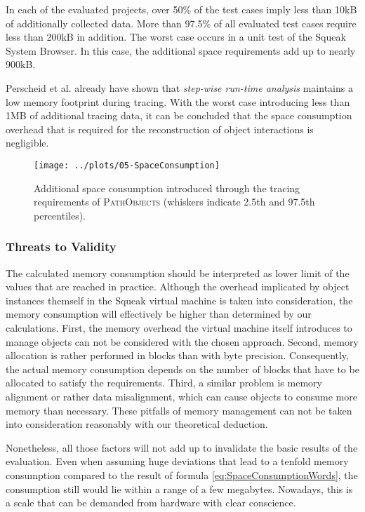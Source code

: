 In each of the evaluated projects, over 50\% of the test cases imply less than 10kB of additionally collected data.
More than 97.5\% of all evaluated test cases require less than 200kB in addition.
The worst case occurs in a unit test of the Squeak System Browser.
In this case, the additional space requirements add up to nearly 900kB.

Perscheid et al. already have shown that \emph{step-wise run-time analysis} maintains a low memory footprint during tracing.
With the worst case introducing less than 1MB of additional tracing data, it can be concluded that the space consumption overhead that is required for the reconstruction of object interactions is negligible.

\begin{figure}[tb!]
	\centering
	\texttt{[image: ../plots/05-SpaceConsumption]}
	\caption[Space Requirements Introduced Through \textsc{PathObjects}]{Additional space consumption introduced through the tracing requirements of \textsc{PathObjects} (whiskers indicate 2.5th and 97.5th percentiles).}
	\label{fig:DiscussionSpace}
\end{figure}

\subsubsection{Threats to Validity}
The calculated memory consumption should be interpreted as lower limit of the values that are reached in practice.
Although the overhead implicated by object instances themself in the Squeak virtual machine is taken into consideration, the memory consumption will effectively be higher than determined by our calculations.
First, the memory overhead the virtual machine itself introduces to manage objects can not be considered with the chosen approach.
Second, memory allocation is rather performed in blocks than with byte precision.
Consequently, the actual memory consumption depends on the number of blocks that have to be allocated to satisfy the requirements.
Third, a similar problem is memory alignment or rather data misalignment, which can cause objects to consume more memory than necessary.
These pitfalls of memory management can not be taken into consideration reasonably with our theoretical deduction.

Nonetheless, all those factors will not add up to invalidate the basic results of the evaluation.
Even when assuming huge deviations that lead to a tenfold memory consumption compared to the result of formula \ref{eq:SpaceConsumptionWords}, the consumption still would lie within a range of a few megabytes.
Nowadays, this is a scale that can be demanded from hardware with clear conscience.

